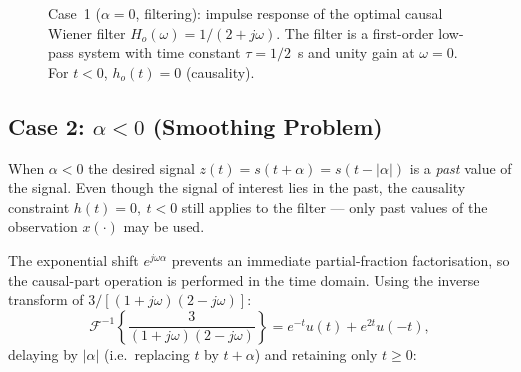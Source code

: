 \documentclass[12pt]{book}
\theoremstyle{definition}
\newcommand{\F}{\mathcal{F}}
\begin{document}
\begin{figure}[htbp]
  \centering
  \caption{Case~1 ($\alpha=0$, filtering): impulse response of the optimal
    causal Wiener filter $H_o(\omega)=1/(2+j\omega)$.  The filter is a
    first-order low-pass system with time constant $\tau=1/2$~s and unity
    gain at $\omega=0$.  For $t<0$, $h_o(t)=0$ (causality).}
  \label{fig:case1_impulse}
\end{figure}

\subsection*{Case 2: $\alpha < 0$ \quad (Smoothing Problem)}
\label{ssec:smoothing}

When $\alpha<0$ the desired signal $z(t)=s(t+\alpha)=s(t-|\alpha|)$ is a
\emph{past} value of the signal.  Even though the signal of interest lies in
the past, the causality constraint $h(t)=0,\ t<0$ still applies to the
filter — only past values of the observation $x(\cdot)$ may be used.

The exponential shift $e^{j\omega\alpha}$ prevents an immediate partial-fraction
factorisation, so the causal-part operation is performed in the time domain.
Using the inverse transform of $3/[(1+j\omega)(2-j\omega)]$:
\[
  \F^{-1}\!\left\{\frac{3}{(1+j\omega)(2-j\omega)}\right\}
  = e^{-t}u(t)+e^{2t}u(-t),
\]
delaying by $|\alpha|$ (i.e.\ replacing $t$ by $t+\alpha$) and retaining only
$t\ge 0$:
\end{document}
